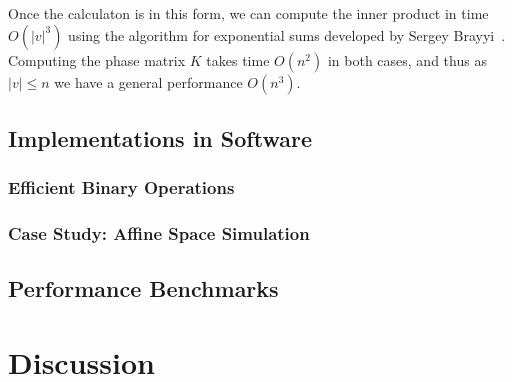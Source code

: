 Once the calculaton is in this form, we can compute the inner product in time $O(\vert v\vert^{3})$ using the algorithm for exponential sums developed by Sergey Brayyi~\cite{Bravyi2018}. Computing the phase matrix $K$ takes time $O(n^{2})$ in both cases, and thus as $\vert v\vert\leq n$ we have a general performance $O(n^{3})$.
\subsection{Implementations in Software}\label{sec:stabilizer_simulators}

\subsubsection*{Efficient Binary Operations}\label{sec:binary_ops}

\subsubsection*{Case Study: Affine Space Simulation}\label{sec:afine_space_sim}

\subsection{Performance Benchmarks}

\section{Discussion}
